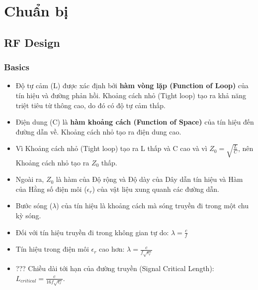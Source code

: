 \chapter{Chuẩn bị}
    \section{RF Design}
        \subsection{Basics}
            \begin{itemize}
                \item Độ tự cảm (L) được xác định bởi \textbf{hàm vòng lặp (Function of Loop)} của tín hiệu và đường phản hồi.
                Khoảng cách nhỏ (Tight loop) tạo ra khả năng triệt tiêu từ thông cao, do đó có độ tự cảm thấp.
                \item Điện dung (C) là \textbf{hàm khoảng cách (Function of Space)} của tín hiệu đến đường dẫn về. Khoảng cách nhỏ tạo ra điện dung cao.
                \item Vì Khoảng cách nhỏ (Tight loop) tạo ra L thấp và C cao và vì $Z_0 = \sqrt{\frac{L}{C}}$, nên Khoảng cách nhỏ tạo ra $Z_0$ thấp.
                \item Ngoài ra, $Z_0$ là hàm của Độ rộng và Độ dày của Dây dẫn tín hiệu và Hàm của Hằng số điện môi ($\epsilon_r$) của vật liệu xung quanh các đường dẫn.
                \item Bước sóng ($\lambda$) của tín hiệu là khoảng cách mà sóng truyền đi trong một chu kỳ sóng.
                \item Đối với tín hiệu truyền đi trong không gian tự do: $\lambda = \frac{c}{f}$
                \item Tín hiệu trong điện môi $\epsilon_r$ cao hơn: $\lambda = \frac{c}{f\sqrt{\epsilon_r}}$
                \item ??? Chiều dài tới hạn của đường truyền (Signal Critical Length): $L_{critical} = \frac{c}{16f\sqrt{\epsilon_r}}$.
            \end{itemize}

            \newpage
